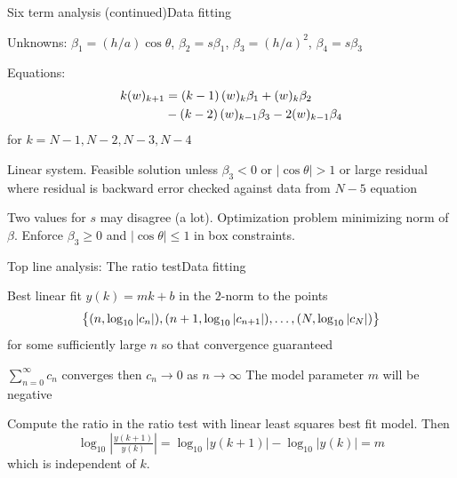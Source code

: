 \documentclass[11pt,svgnames,fleqn]{beamer}
\newcommand{\NC}[1]{{\color{red}#1}}
\newcommand{\DM}[1]{\begin{displaymath} {#1} \end{displaymath}}
\begin{document}
\begin{frame}{Six term analysis (continued)}{Data fitting}

 Unknowns:
  $\beta_1 = (h/a) \cos \theta$,
  $\beta_2 = s \beta_1$,
  $\beta_3 = (h/a)^2$,
  $\beta_4 = s \beta_3$

  \vspace{2mm}

  Equations:
  \begin{align*}
    k (w)_{k+1} & = \left( {k-1} \right) (w)_{k} \beta_1 +  (w)_{k} \beta_2 \\
                  & - \left( {k-2} \right) (w)_{k-1} \beta_3 - 2 (w)_{k-1} \beta_4
  \end{align*}
  for $k=N-1, N-2, N-3, N-4$

  \vspace{2mm}

  Linear system. Feasible solution unless $\beta_3 < 0$ or $|\cos \theta| > 1$ or
  large residual where residual is backward error checked against
  data from $N-5$ equation

  \vspace{2mm}

  Two values for $s$ may disagree (a lot).
  Optimization problem minimizing norm of $\beta$.
  Enforce $\beta_3 \geq 0$ and $|\cos \theta| \leq 1$ in box constraints.

\end{frame}

\begin{frame}{Top line analysis: The ratio test}{Data fitting}

Best linear fit $y(k) = m k + b$ in the $2$-norm to the points
\DM
{
  \Setbg{(n, \log_{10} | c_{n} |), (n+1, \log_{10} |c_{n+1}|), \ldots, (N, \log_{10} |c_{N}|)}
}
for some sufficiently large $n$ so that convergence guaranteed
\vspace{4mm}

$\sum_{n=0}^{\infty} c_n$ converges then $c_n \rightarrow 0$ as $n \rightarrow \infty$
\NC{The model parameter $m$ will be negative}

\vspace{4mm}

Compute the ratio in the ratio test with linear least squares best fit model. Then
\DM
{
  \log_{10} \left| \tfrac{y(k+1)}{y(k)} \right| = \log_{10} | y(k+1) | - \log_{10} | y(k) | = m
}
which is independent of $k$.

\end{frame}
\end{document}
